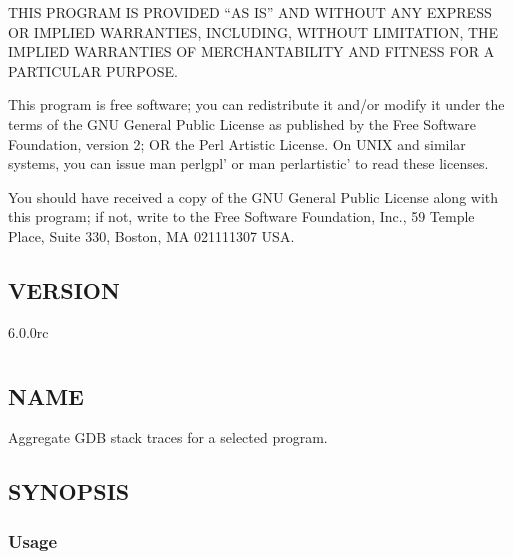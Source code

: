 \documentclass[letterpaper,10pt,english]{sphinxmanual}
\begin{document}
THIS PROGRAM IS PROVIDED “AS IS” AND WITHOUT ANY EXPRESS OR IMPLIED
WARRANTIES, INCLUDING, WITHOUT LIMITATION, THE IMPLIED WARRANTIES OF
MERCHANTABILITY AND FITNESS FOR A PARTICULAR PURPOSE.

This program is free software; you can redistribute it and/or modify it under
the terms of the GNU General Public License as published by the Free Software
Foundation, version 2; OR the Perl Artistic License.  On UNIX and similar
systems, you can issue \textasciigrave{}man perlgpl’ or \textasciigrave{}man perlartistic’ to read these
licenses.

You should have received a copy of the GNU General Public License along with
this program; if not, write to the Free Software Foundation, Inc., 59 Temple
Place, Suite 330, Boston, MA  02111\sphinxhyphen{}1307  USA.


\section{VERSION}
\label{\detokenize{mariadb-schema-change:version}}
 6.0.0rc


\chapter{}
\label{\detokenize{mariadb-stacktrace:mariadb-stacktrace}}\label{\detokenize{mariadb-stacktrace::doc}}

\section{NAME}
\label{\detokenize{mariadb-stacktrace:name}}
 \sphinxhyphen{} Aggregate GDB stack traces for a selected program.


\section{SYNOPSIS}
\label{\detokenize{mariadb-stacktrace:synopsis}}

\subsection{Usage}
\label{\detokenize{mariadb-stacktrace:usage}}
\begin{sphinxVerbatim}[commandchars=\\\{\}]
 \PYG{p}{[}\PYG{p}{]} \PYG{p}{[}\PYG{p}{]}
\end{sphinxVerbatim}
\end{document}
